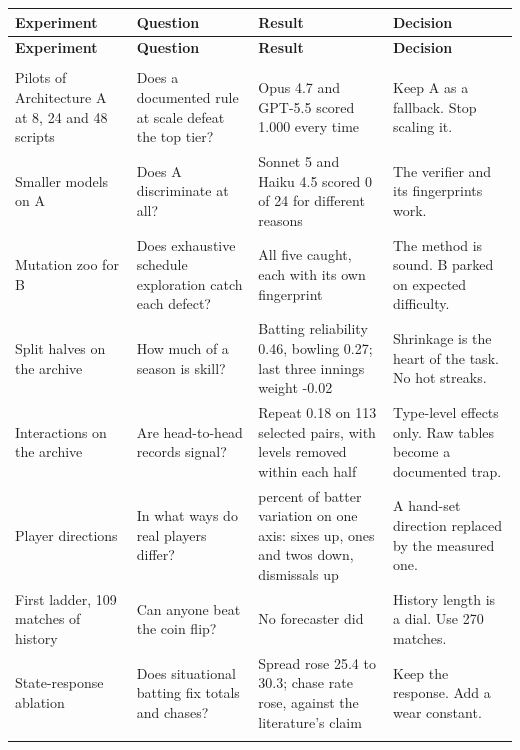 \documentclass[11pt,letterpaper]{article}
\begin{document}
\begin{small}
\begin{longtable}{>{\raggedright\arraybackslash}p{}>{\raggedright\arraybackslash}p{}>{\raggedright\arraybackslash}p{}>{\raggedright\arraybackslash}p{}}
\toprule
\textbf{Experiment} & \textbf{Question} & \textbf{Result} & \textbf{Decision} \\ \midrule
\endfirsthead
\toprule
\textbf{Experiment} & \textbf{Question} & \textbf{Result} & \textbf{Decision} \\ \midrule
\endhead
\midrule \multicolumn{4}{r}{\footnotesize continued on the next page} \\ \endfoot
\bottomrule \endlastfoot
Pilots of Architecture A at 8, 24 and 48 scripts & Does a documented rule at scale defeat the top tier? & Opus 4.7 and GPT-5.5 scored 1.000 every time & Keep A as a fallback. Stop scaling it. \\ \addlinespace[2pt]
Smaller models on A & Does A discriminate at all? & Sonnet 5 and Haiku 4.5 scored 0 of 24 for different reasons & The verifier and its fingerprints work. \\ \addlinespace[2pt]
Mutation zoo for B & Does exhaustive schedule exploration catch each defect? & All five caught, each with its own fingerprint & The method is sound. B parked on expected difficulty. \\ \addlinespace[2pt]
Split halves on the archive & How much of a season is skill? & Batting reliability 0.46, bowling 0.27; last three innings weight -0.02 & Shrinkage is the heart of the task. No hot streaks. \\ \addlinespace[2pt]
Interactions on the archive & Are head-to-head records signal? & Repeat 0.18 on 113 selected pairs, with levels removed within each half & Type-level effects only. Raw tables become a documented trap. \\ \addlinespace[2pt]
Player directions & In what ways do real players differ? & 71 percent of batter variation on one axis: sixes up, ones and twos down, dismissals up & A hand-set direction replaced by the measured one. \\ \addlinespace[2pt]
First ladder, 109 matches of history & Can anyone beat the coin flip? & No forecaster did & History length is a dial. Use 270 matches. \\ \addlinespace[2pt]
State-response ablation & Does situational batting fix totals and chases? & Spread rose 25.4 to 30.3; chase rate rose, against the literature's claim & Keep the response. Add a wear constant. \\ \addlinespace[2pt]

\end{longtable}
\end{small}
\end{document}
